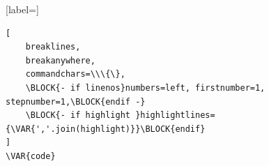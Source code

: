 \begin{code}[label={}]
\begin{Verbatim}[
    breaklines,
    breakanywhere,
    commandchars=\\\{\},
    \BLOCK{- if linenos}numbers=left, firstnumber=1, stepnumber=1,\BLOCK{endif -}
    \BLOCK{- if highlight }highlightlines={\VAR{','.join(highlight)}}\BLOCK{endif}
]
\VAR{code}\end{Verbatim}
\end{code}
